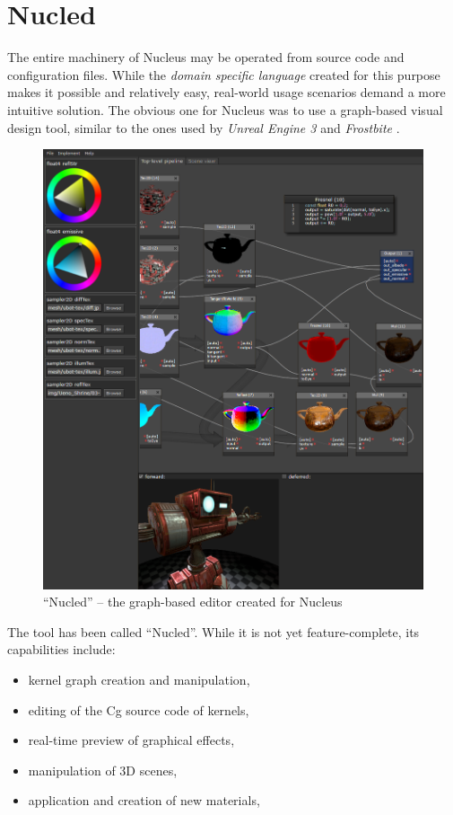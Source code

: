 
\chapter{ Nucled }
\label{Chapter5}

The entire machinery of Nucleus may be operated from source code and configuration files. While the \emph{ domain specific language } created for this purpose makes it possible and relatively easy, real-world usage scenarios demand a more intuitive solution. The obvious one for Nucleus was to use a graph-based visual design tool, similar to the ones used by \emph{Unreal Engine 3} \cite{ue3MaterialEditor} and \emph{Frostbite} \cite{AT07}.

\begin{figure}[h!]
  \centering
    \includegraphics[width=0.9\linewidth]{./Figures/Nucled.png}
    \caption[Nucled]{``Nucled'' -- the graph-based editor created for Nucleus}
  \label{fig:Nucled}
\end{figure}


The tool has been called ``Nucled''. While it is not yet feature-complete, its capabilities include:

\begin{itemize}
\item kernel graph creation and manipulation,
\item editing of the Cg source code of kernels,
\item real-time preview of graphical effects,
\item manipulation of 3D scenes,
\item application and creation of new materials,
\end{itemize}

